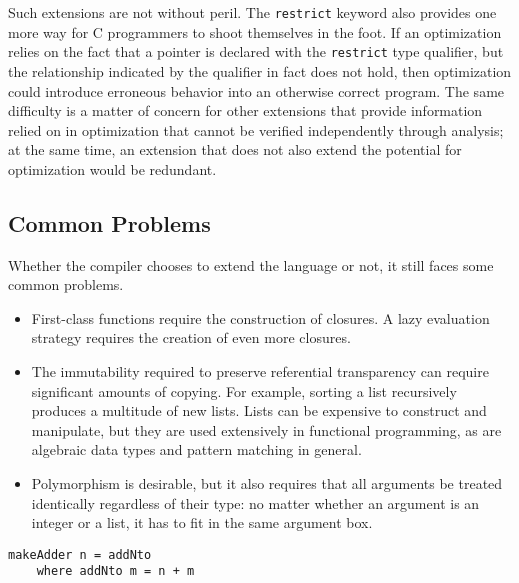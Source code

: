 Such extensions are not without peril. The \lstinline[morekeywords=restrict]{restrict} keyword also provides one more way for C programmers to shoot themselves in the foot. If an optimization relies on the fact that a pointer is declared with the \lstinline[morekeywords=restrict]{restrict} type qualifier, but the relationship indicated by the qualifier in fact does not hold, then optimization could introduce erroneous behavior into an otherwise correct program. The same difficulty is a matter of concern for other extensions that provide information relied on in optimization that cannot be verified independently through analysis; at the same time, an extension that does not also extend the potential for optimization would be redundant.

\subsection{Common Problems}
Whether the compiler chooses to extend the language or not, it still faces some common problems.
\begin{itemize}
\item
First-class functions require the construction of closures. A lazy evaluation strategy requires the creation of even more closures.

\item 
The immutability required to preserve referential transparency can require significant amounts of copying. For example, sorting a list recursively produces a multitude of new lists. Lists can be expensive to construct and manipulate, but they are used extensively in functional programming, as are algebraic data types and pattern matching in general.

\item
Polymorphism is desirable, but it also requires that all arguments be treated identically regardless of their type: no matter whether an argument is an integer or a list, it has to fit in the same argument box.
\end{itemize}

\begin{lstlisting}[float,caption={Creating a closure},label={closure}]
makeAdder n = addNto
    where addNto m = n + m
\end{lstlisting}

